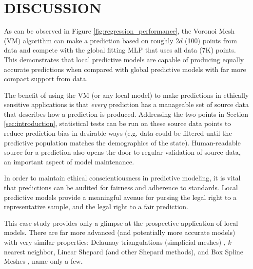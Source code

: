 \documentclass[conference]{IEEEtran}
\newcommand{\thomastilde}{\raisebox{0.1ex}{\texttildelow}}
\begin{document}
\section{DISCUSSION}
\label{sec:discussion}

As can be observed in Figure \ref{fig:regression_performance}, the Voronoi Mesh (VM) algorithm can make a prediction based on roughly $2d$ (\thomastilde{}100) points from data and compete with the global fitting MLP that uses all data (\thomastilde{}7K) points. This demonstrates that local predictive models are capable of producing equally accurate predictions when compared with global predictive models with far more compact support from data.

The benefit of using the VM (or any local model) to make predictions in ethically sensitive applications is that \textit{every} prediction has a manageable set of source data that describes how a prediction is produced. Addressing the two points in Section \ref{sec:introduction}, statistical tests can be run on these source data points to reduce prediction bias in desirable ways (e.g. data could be filtered until the predictive population matches the demographics of the state). Human-readable source for a prediction also opens the door to regular validation of source data, an important aspect of model maintenance.

In order to maintain ethical conscientiousness in predictive modeling, it is vital that predictions can be audited for fairness and adherence to standards. Local predictive models provide a meaningful avenue for pursing the legal right to a representative sample, and the legal right to a fair prediction.

This case study provides only a glimpse at the prospective application of local models. There are far more advanced (and potentially more accurate models) with very similar properties: Delaunay triangulations (simplicial meshes) \cite{chang2018polynomial}, $k$ nearest neighbor, Linear Shepard \cite{thacker2010algorithm} (and other Shepard methods), and Box Spline Meshes \cite{lux2018novel}, name only a few.

\end{document}
